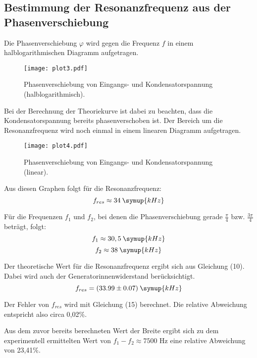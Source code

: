 \subsection{Bestimmung der Resonanzfrequenz aus der Phasenverschiebung}

Die Phasenverschiebung $\varphi$ wird gegen die Frequenz $f$ in einem halblogarithmischen
Diagramm aufgetragen.

\begin{figure}[H]
  \centering
  \texttt{[image: plot3.pdf]}
  \caption{Phasenverschiebung von Eingangs- und Kondensatorspannung (halblogarithmisch).}
  \label{fig:plot3}
\end{figure}



Bei der Berechnung der Theoriekurve ist dabei zu beachten, dass die Kondensatorspannung
bereits phasenverschoben ist.
Der Bereich um die Resonanzfrequenz wird noch einmal in einem linearen Diagramm aufgetragen.

\begin{figure}[H]
  \centering
  \texttt{[image: plot4.pdf]}
  \caption{Phasenverschiebung von Eingangs- und Kondensatorspannung (linear).}
  \label{fig:plot4}
\end{figure}

Aus diesen Graphen folgt für die Resonanzfrequenz:
\begin{equation*}
  f_{res} \approx 34 \:\symup{kHz}
\end{equation*}

Für die Frequenzen $f_1$ und $f_2$, bei denen die Phasenverschiebung gerade
$\frac{\pi}{4}$ bzw. $\frac{3\pi}{4}$ beträgt, folgt:
\begin{equation*}
  f_1 \approx 30,5 \:\symup{kHz}
\end{equation*}
\begin{equation*}
  f_2 \approx 38 \:\symup{kHz}
\end{equation*}

Der theoretische Wert für die Resonanzfrequenz ergibt sich aus Gleichung (10).
Dabei wird auch der Generatorinnenwiderstand berücksichtigt.
\begin{equation*}
  f_{res} = (33.99 \pm 0.07) \:\symup{kHz}
\end{equation*}

Der Fehler von $f_{res}$ wird mit Gleichung (15) berechnet.
Die relative Abweichung entspricht also circa 0,02\%.

Aus dem zuvor bereits berechneten Wert der Breite ergibt sich zu dem experimentell
ermittelten Wert von $f_1 - f_2 \approx 7500$ Hz eine relative Abweichung von 23,41\%.
